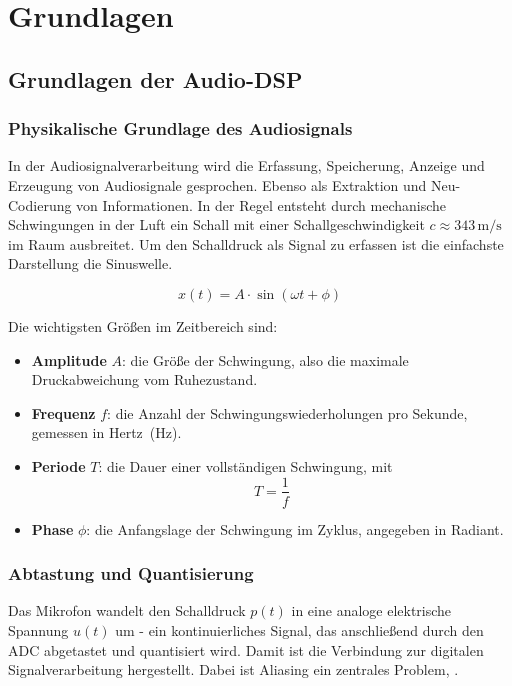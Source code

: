 \chapter{Grundlagen}

\section{Grundlagen der Audio-DSP}

\subsection{Physikalische Grundlage des Audiosignals}

In der Audiosignalverarbeitung wird die Erfassung, Speicherung, Anzeige und Erzeugung von Audiosignale gesprochen. Ebenso als Extraktion und Neu-Codierung von Informationen.
In der Regel entsteht durch mechanische Schwingungen in der Luft ein Schall mit einer Schallgeschwindigkeit $c \approx 343 \, \text{m/s}$ im Raum ausbreitet. Um den Schalldruck als Signal zu erfassen ist die einfachste Darstellung die Sinuswelle. \cite{rossing2007springer}

\begin{equation}
	x(t) = A \cdot \sin(\omega t + \phi)
\end{equation}

Die wichtigsten Größen im Zeitbereich sind:

\begin{itemize}
	\item \textbf{Amplitude} $A$: die Größe der Schwingung, also die maximale Druckabweichung vom Ruhezustand.
	\item \textbf{Frequenz} $f$: die Anzahl der Schwingungswiederholungen pro Sekunde, gemessen in Hertz~(Hz).
	\item \textbf{Periode} $T$: die Dauer einer vollständigen Schwingung, mit
	\begin{equation}
		T = \frac{1}{f}
	\end{equation}
	\item \textbf{Phase} $\phi$: die Anfangslage der Schwingung im Zyklus, angegeben in Radiant.
\end{itemize}

\subsection{Abtastung und Quantisierung}
Das Mikrofon wandelt den Schalldruck $p(t)$ in eine analoge elektrische Spannung $u(t)$ um - ein kontinuierliches Signal, das anschließend durch den ADC abgetastet und quantisiert wird. Damit ist die Verbindung zur digitalen Signalverarbeitung hergestellt. Dabei ist Aliasing ein zentrales Problem,   \cite{rossing2007springer}.


